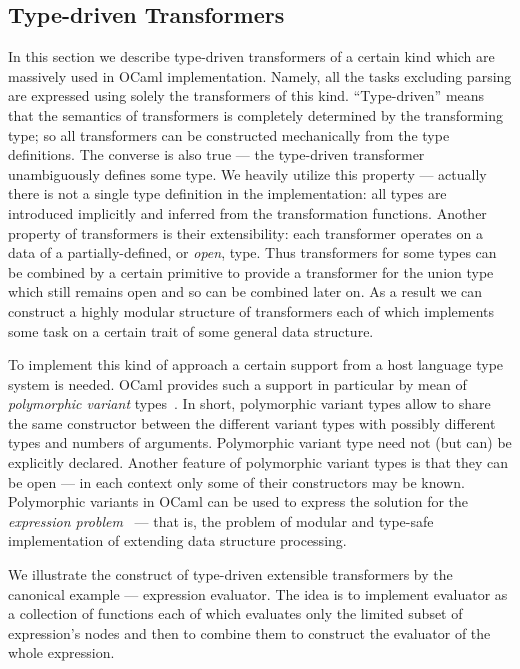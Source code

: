 \subsection{Type-driven Transformers}

In this section we describe type-driven transformers of a certain kind which are 
massively used in OCaml implementation. Namely, all the tasks excluding parsing
are expressed using solely the transformers of this kind. ``Type-driven'' means that
the semantics of transformers is completely determined by the transforming type; 
so all transformers can be constructed mechanically from the type definitions.
The converse is also true --- the type-driven transformer unambiguously defines
some type. We heavily utilize this property --- actually there is not a single 
type definition in the implementation: all types are introduced implicitly 
and inferred from the transformation functions. Another property of transformers
is their extensibility: each transformer operates on a data of a partially-defined, 
or \emph{open}, type. Thus transformers for some types can be combined by a certain primitive
to provide a transformer for the union type which still remains open and so can be
combined later on. As a result we can construct a highly modular structure of
transformers each of which implements some task on a certain trait of some general
data structure. 

To implement this kind of approach a certain support from a host language type 
system is needed. OCaml provides such a support in particular by mean of 
\emph{polymorphic variant} types~\cite{PV}. In short, polymorphic variant types allow to 
share the same constructor between the different variant types with possibly different 
types and numbers of arguments. Polymorphic variant type need not (but can) be explicitly
declared. Another feature of polymorphic variant types is that they can be open --- in each
context only some of their constructors may be known. Polymorphic variants in OCaml 
can be used to express the solution for the \emph{expression problem}~\cite{Exproblem, PVReuse} --- 
that is, the problem of modular and type-safe implementation of extending data structure 
processing. 

We illustrate the construct of type-driven extensible transformers by the canonical
example --- expression evaluator. The idea is to implement evaluator as a
collection of functions each of which evaluates only the limited subset of expression's
nodes and then to combine them to construct the evaluator of the whole expression.

